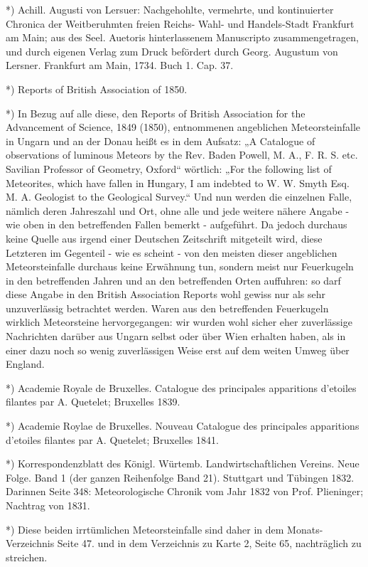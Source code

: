 \documentclass[a4paper, 8pt, oneside, polutonikogreek, german]{article}
\begin{document}
*) Achill. Augusti von Lersuer: Nachgehohlte, vermehrte, und kontinuierter Chronica der Weitberuhmten freien Reichs- Wahl- und Handels-Stadt Frankfurt am Main; aus des Seel. Auetoris hinterlassenem Manuscripto zusammengetragen, und durch eigenen Verlag zum Druck befördert durch Georg. Augustum von Lersner. Frankfurt am Main, 1734. Buch 1. Cap. 37.

*) Reports of British Association of 1850.

*) In Bezug auf alle diese, den Reports of British Association for the Advancement of Science, 1849 (1850), entnommenen angeblichen Meteorsteinfalle in Ungarn und an der Donau heißt es in dem Aufsatz: „A Catalogue of observations of luminous Meteors by the Rev. Baden Powell, M. A., F. R. S. etc. Savilian Professor of Geometry, Oxford“ wörtlich: „For the following list of Meteorites, which have fallen in Hungary, I am indebted to W. W. Smyth Esq. M. A. Geologist to the Geological Survey.“ Und nun werden die einzelnen Falle, nämlich deren Jahreszahl und Ort, ohne alle und jede weitere nähere Angabe - wie oben in den betreffenden Fallen bemerkt - aufgeführt. Da jedoch durchaus keine Quelle aus irgend einer Deutschen Zeitschrift mitgeteilt wird, diese Letzteren im Gegenteil - wie es scheint - von den meisten dieser angeblichen Meteorsteinfalle durchaus keine Erwähnung tun, sondern meist nur Feuerkugeln in den betreffenden Jahren und an den betreffenden Orten auffuhren: so darf diese Angabe in den British Association Reports wohl gewiss nur als sehr unzuverlässig betrachtet werden. Waren aus den betreffenden Feuerkugeln wirklich Meteorsteine hervorgegangen: wir wurden wohl sicher eher zuverlässige Nachrichten darüber aus Ungarn selbst oder über Wien erhalten haben, als in einer dazu noch so wenig zuverlässigen Weise erst auf dem weiten Umweg über England.

*) Academie Royale de Bruxelles. Catalogue des principales apparitions d'etoiles filantes par A. Quetelet; Bruxelles 1839.

*) Academie Roylae de Bruxelles. Nouveau Catalogue des principales apparitions d'etoiles filantes par A. Quetelet; Bruxelles 1841.

*) Korrespondenzblatt des Königl. Würtemb. Landwirtschaftlichen Vereins. Neue Folge. Band 1 (der ganzen Reihenfolge Band 21). Stuttgart und Tübingen 1832. Darinnen Seite 348: Meteorologische Chronik vom Jahr 1832 von Prof. Plieninger; Nachtrag von 1831.

*) Diese beiden irrtümlichen Meteorsteinfalle sind daher in dem Monats-Verzeichnis Seite 47. und in dem Verzeichnis zu Karte 2, Seite 65, nachträglich zu streichen.
\end{document}
